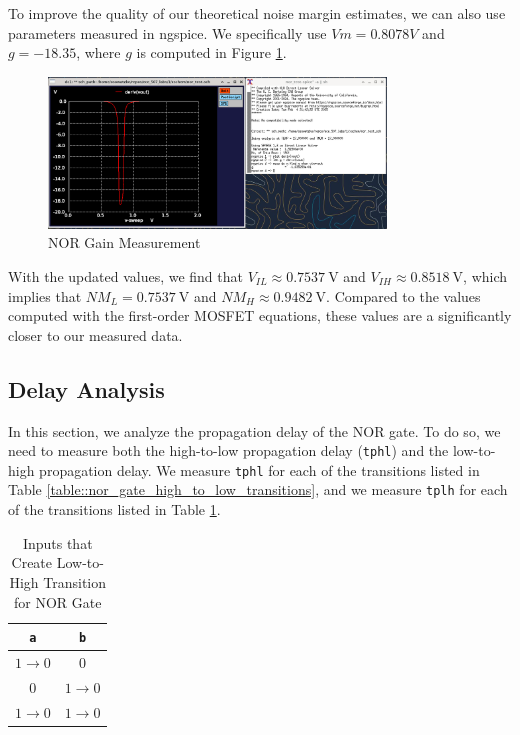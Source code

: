 \documentclass[fleqn]{article}
\begin{document}
	To improve the quality of our theoretical noise margin estimates, we can also use parameters measured in ngspice. We specifically use $Vm = 0.8078 V$ and $g = -18.35$, where $g$ is computed in Figure \ref{fig::nor_noise_analysis_g_sweep_va_vb}.
	
	\begin{figure}[H]
		\centerline{\includegraphics[width=0.8\textwidth]{nor_noise_analysis_g_sweep_va_vb.png}}
		\caption{NOR Gain Measurement}
		\label{fig::nor_noise_analysis_g_sweep_va_vb}
	\end{figure}
	
	\noindent With the updated values, we find that $V_{IL} \approx 0.7537\ \text{V}$ and $V_{IH} \approx 0.8518\ \text{V}$, which implies that $NM_L = 0.7537\ \text{V}$ and $NM_H \approx 0.9482\ \text{V}$. Compared to the values computed with the first-order MOSFET equations, these values are a significantly closer to our measured data.
	
	\subsection{Delay Analysis}
	
	In this section, we analyze the propagation delay of the NOR gate. To do so, we need to measure both the high-to-low propagation delay (\texttt{tphl}) and the low-to-high propagation delay. We measure \texttt{tphl} for each of the transitions listed in Table \ref{table::nor_gate_high_to_low_transitions}, and we measure \texttt{tplh} for each of the transitions listed in Table \ref{table::nor_gate_low_to_high_transitions}.
	
	\begin{table}[H]
	\begin{center}
	\caption{Inputs that Create Low-to-High Transition for NOR Gate}
	\label{table::nor_gate_low_to_high_transitions}
	\begin{tabular}{| c | c |}
		\hline
		\texttt{a} & \texttt{b} \\
		\hline	
		$1 \rightarrow 0$ & $0$\\
		\hline	
		$0$ & $1 \rightarrow 0$\\
		\hline	
		$1 \rightarrow 0$ & $1 \rightarrow 0$\\
		\hline
	\end{tabular}
	\end{center}
	\end{table}
	
\end{document}
